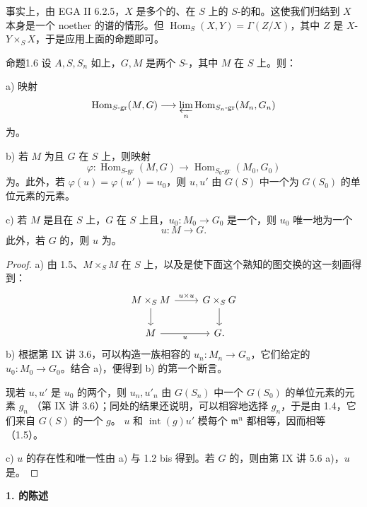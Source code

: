 事实上，由 EGA II 6.2.5，$X$ 是多个的、在 $S$ 上的 $S$-的和。这使我们归结到 $X$ 本身是一个 noether 的谱的情形。但 $\operatorname{Hom}_S(X,Y)=\Gamma(Z/X)$，其中 $Z$ 是 $X$- $Y\times_S X$，于是应用上面的命题即可。
\begin{SGAresult}{命题}{1.6}
设 $A,S,S_n$ 如上，$G,M$ 是两个 $S$-，其中 $M$ 在 $S$ 上。则：

a) 映射
\[\operatorname{Hom}_{S\text{-gr}}(M,G)\longrightarrow\varprojlim_n\operatorname{Hom}_{S_n\text{-gr}}(M_n,G_n)\]
为。

b) 若 $M$ 为且 $G$ 在 $S$ 上，则映射
\[\varphi:\operatorname{Hom}_{S\text{-gr}}(M,G)\longrightarrow\operatorname{Hom}_{S_0\text{-gr}}(M_0,G_0)\]
为。此外，若 $\varphi(u)=\varphi(u')=u_0$，则 $u,u'$ 由 $G(S)$ 中一个为 $G(S_0)$ 的单位元素的元素。

c) 若 $M$ 是且在 $S$ 上，$G$ 在 $S$ 上且，$u_0:M_0\to G_0$ 是一个，则 $u_0$ 唯一地为一个
\[u:M\longrightarrow G.\]
此外，若 $G$ 的，则 $u$ 为。
\end{SGAresult}
\begin{proof}
a) 由 1.5、$M\times_S M$ 在 $S$ 上，以及是使下面这个熟知的图交换的这一刻画得到：
\[
\begin{tikzcd}
M\times_S M\arrow[r,"u\times u"]\arrow[d]&G\times_S G\arrow[d]\\
M\arrow[r,"u"']&G.
\end{tikzcd}
\]
b) 根据第 IX 讲 3.6，可以构造一族相容的 $u_n:M_n\to G_n$，它们给定的 $u_0:M_0\to G_0$。结合 a)，便得到 b) 的第一个断言。

现若 $u,u'$ 是 $u_0$ 的两个，则 $u_n,u'_n$ 由 $G(S_n)$ 中一个 $G(S_0)$ 的单位元素的元素 $g_n$ （第 IX 讲 3.6）；同处的结果还说明，可以相容地选择 $g_n$，于是由 1.4，它们来自 $G(S)$ 的一个 $g$。 $u$ 和 $\operatorname{int}(g)u'$ 模每个 $\mathfrak m^n$ 都相等，因而相等（1.5）。

c) $u$ 的存在性和唯一性由 a) 与 1.2 bis 得到。若 $G$ 的，则由第 IX 讲 5.6 a)，$u$ 是。
\end{proof}
\textbf{1. 的陈述}

